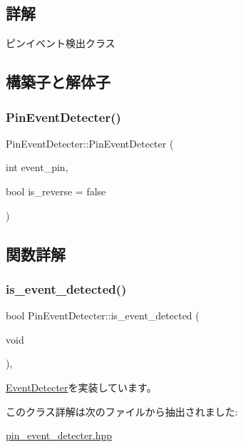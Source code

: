 \subsection{詳解}
ピンイベント検出クラス 

\subsection{構築子と解体子}
\mbox{\label{class_pin_event_detecter_aa1d81fff7c1bdbbf0351466d2f5784d5}} 
\subsubsection{\texorpdfstring{PinEventDetecter()}{PinEventDetecter()}}
{\footnotesize\ttfamily Pin\+Event\+Detecter\+::\+Pin\+Event\+Detecter (\begin{DoxyParamCaption}\item[{int}]{event\+\_\+pin,  }\item[{bool}]{is\+\_\+reverse = {\ttfamily false} }\end{DoxyParamCaption})\hspace{0.3cm}{\ttfamily [inline]}}



\subsection{関数詳解}
\mbox{\label{class_pin_event_detecter_a6e65a11e39838c30f58c66dd057abc90}} 
\subsubsection{\texorpdfstring{is\_event\_detected()}{is\_event\_detected()}}
{\footnotesize\ttfamily bool Pin\+Event\+Detecter\+::is\+\_\+event\+\_\+detected (\begin{DoxyParamCaption}\item[{void}]{ }\end{DoxyParamCaption})\hspace{0.3cm}{\ttfamily [inline]}, {\ttfamily [virtual]}}



\mbox{\hyperlink{class_event_detecter_ae5f2c62e1226dcd9434eef3db92a8a70}{Event\+Detecter}}を実装しています。



このクラス詳解は次のファイルから抽出されました\+:\begin{DoxyCompactItemize}
\item 
\mbox{\hyperlink{pin__event__detecter_8hpp}{pin\+\_\+event\+\_\+detecter.\+hpp}}\end{DoxyCompactItemize}
